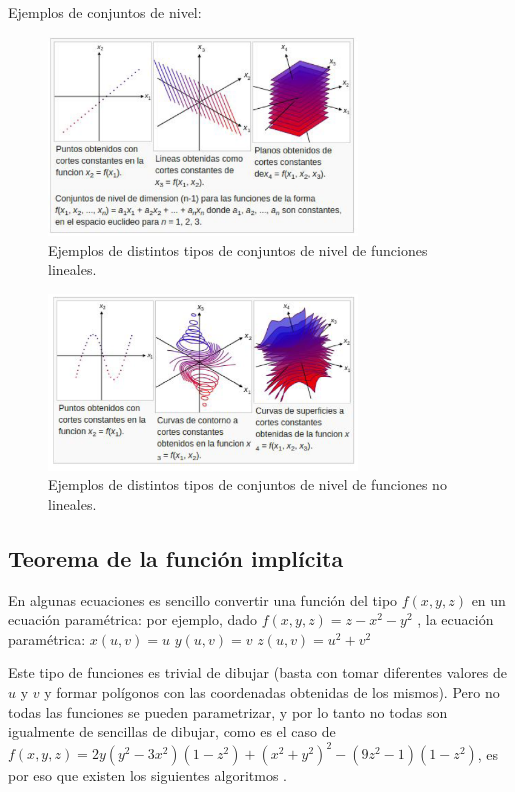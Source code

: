 \documentclass[12pt]{article}
\begin{document}
Ejemplos de conjuntos de nivel:
\begin{figure}[h!]
\includegraphics[width=0.73\textwidth,center]{meshers1.png}
\caption{Ejemplos de distintos tipos de conjuntos de nivel de funciones lineales.}
\end{figure}
\begin{figure}[h!]
\includegraphics[width=0.73\textwidth,center]{meshers2.png}
\caption{Ejemplos de distintos tipos de conjuntos de nivel de funciones no lineales.}
\end{figure}
\clearpage
\subsection{Teorema de la función implícita}
En algunas ecuaciones es sencillo convertir una función del tipo $f(x,y,z)$ en un ecuación paramétrica: por ejemplo, dado $f(x,y,z)  = z- x^2 - y^2$ , la ecuación paramétrica: 
$x(u,v) = u$
$y(u,v) = v$
$z(u,v) = u^2+v^2$

Este tipo de funciones es trivial de dibujar (basta con tomar diferentes valores de $u$ y $v$ y formar polígonos con las coordenadas obtenidas de los mismos).
Pero no todas las funciones se pueden parametrizar, y por lo tanto no todas son igualmente de sencillas de dibujar, como es el caso de  $f(x,y,z) = 2y(y^2-3x^2)(1-z^2)+(x^2+y^2)^2-(9z^2-1)(1-z^2)$, es por eso que existen los siguientes algoritmos \cite{implicitas}.
\end{document}
